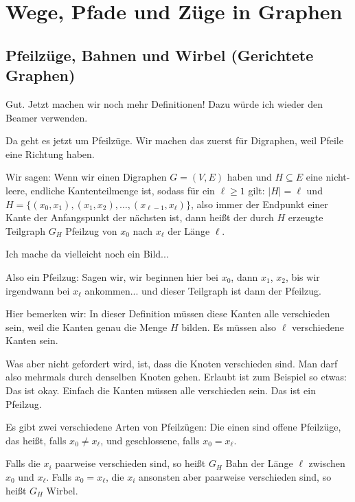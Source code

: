 \section{Wege, Pfade und Züge in Graphen}

\subsection{Pfeilzüge, Bahnen und Wirbel (Gerichtete Graphen)}

\begin{spoken-clean}[01:01:13 - 01:03:04]
Gut. Jetzt machen wir noch mehr Definitionen! Dazu würde ich wieder den Beamer verwenden.

Da geht es jetzt um Pfeilzüge. Wir machen das zuerst für Digraphen, weil Pfeile eine Richtung haben.

Wir sagen: Wenn wir einen Digraphen $G = (V, E)$ haben und $H \subseteq E$ eine nicht-leere, endliche Kantenteilmenge ist, sodass für ein $\ell \ge 1$ gilt: $|H| = \ell$ und $H = \{ (x_0, x_1), (x_1, x_2), \dots, (x_{\ell-1}, x_\ell) \}$, also immer der Endpunkt einer Kante der Anfangspunkt der nächsten ist, dann heißt der durch $H$ erzeugte Teilgraph $G_H$ Pfeilzug von $x_0$ nach $x_\ell$ der Länge $\ell$.

Ich mache da vielleicht noch ein Bild... 
\end{spoken-clean}

\begin{spoken-clean}[01:03:04 - 01:04:52]
Also ein Pfeilzug: Sagen wir, wir beginnen hier bei $x_0$, dann $x_1$, $x_2$, bis wir irgendwann bei $x_\ell$ ankommen... und dieser Teilgraph ist dann der Pfeilzug.

Hier bemerken wir: In dieser Definition müssen diese Kanten alle verschieden sein, weil die Kanten genau die Menge $H$ bilden. Es müssen also $\ell$ verschiedene Kanten sein.

Was aber nicht gefordert wird, ist, dass die Knoten verschieden sind. Man darf also mehrmals durch denselben Knoten gehen. Erlaubt ist zum Beispiel so etwas:  Das ist okay. Einfach die Kanten müssen alle verschieden sein. Das ist ein Pfeilzug.

Es gibt zwei verschiedene Arten von Pfeilzügen: Die einen sind offene Pfeilzüge, das heißt, falls $x_0 \neq x_\ell$, und geschlossene, falls $x_0 = x_\ell$.

Falls die $x_i$ paarweise verschieden sind, so heißt $G_H$ Bahn der Länge $\ell$ zwischen $x_0$ und $x_\ell$. Falls $x_0 = x_\ell$, die $x_i$ ansonsten aber paarweise verschieden sind, so heißt $G_H$ Wirbel.
\end{spoken-clean}


